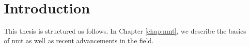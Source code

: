 \chapter{Introduction}
\label{chap:intro}






This thesis is structured as follows. In Chapter \ref{chap:nmt}, we describe the
basics of \gls{nmt} as well as recent advancements in the field. %


